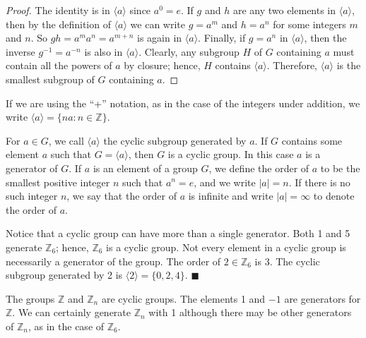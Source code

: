  
\begin{proof}
The identity is in $\langle a \rangle $ since $a^0 = e$. If $g$ and
$h$ are any two elements in $\langle a \rangle $, then by the
definition of $\langle a \rangle$ we can write $g = a^m$ and $h = a^n$
for some integers $m$ and $n$. So $gh = a^m a^n = a^{m+n}$ is again in
$\langle a \rangle $. Finally, if $g = a^n$ in $\langle a \rangle $,
then the inverse $g^{-1} = a^{-n}$ is also in $\langle a \rangle $.
Clearly, any subgroup $H$ of $G$ containing $a$ must contain all the
powers of $a$ by closure; hence, $H$ contains $\langle a \rangle $.
Therefore, $\langle a \rangle $ is the smallest subgroup of $G$
containing $a$. 
\end{proof}
 
 
\medskip
 
 
If we are using the ``+'' notation, as in the case of the integers under
addition, we write $\langle a \rangle  = \{ na : n \in {\mathbb Z} \}$.
 
 
\medskip
 
 
For $a \in G$, we call $\langle a \rangle $ the {\bfi cyclic
subgroup\/} generated by $a$. If $G$ contains
some element $a$ such that $G = \langle a \rangle $, then $G$ is a
{\bfi cyclic group}. In this case $a$ is a {\bfi
generator\/} of $G$.  If $a$ is an
element of a group $G$, we define the {\bfi order} of $a$ to be the smallest positive integer $n$ such that $a^n= e$,
and we write $|a| = n$\label{noteelementorder}. If there is no such
integer $n$, we say that the order of $a$ is infinite and  write $|a|
= \infty$ to denote the order of $a$.
 
 
\medskip
 
 
Notice that a cyclic group can have more than a single
generator. Both 1 and 5 generate ${\mathbb Z}_6$; hence, ${\mathbb Z}_6$ is
a cyclic group. Not every element in a cyclic group is necessarily a
generator of the group. The order of $2 \in {\mathbb Z}_6$ is 3. The
cyclic subgroup generated by 2 is $\langle 2 \rangle  = \{ 0, 2, 4
\}$.  
\hspace{\fill} $\blacksquare$
 
 
\vspace{2ex}
 
 
The groups ${\mathbb Z}$ and ${\mathbb Z}_n$ are cyclic groups. The elements
1 and $-1$ are generators for ${\mathbb Z}$.  We can certainly generate
${\mathbb Z}_n$ with 1 although there may be other generators of ${\mathbb
Z}_n$, as in the case of ${\mathbb Z}_6$. 
 
